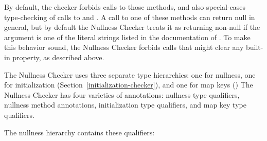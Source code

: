 \begin{enumerate}
\begin{itemize}
  By default, the checker forbids calls to those methods, and also
  special-cases type-checking of calls to
  and
  .
  A call to one of these methods
  can return null in general, but by default the Nullness Checker treats it
  as returning non-null if the argument is one of the literal strings
  listed in the documentation of
  .
  To make this behavior sound, the Nullness Checker forbids calls that
  might clear any built-in property, as described above.
\end{itemize}

\end{enumerate}



The Nullness Checker uses three separate type hierarchies:  one for nullness,
one for initialization (Section~\ref{initialization-checker}),
and one for map keys ()
The Nullness Checker has four varieties of annotations:  nullness
type qualifiers, nullness method annotations, initialization type qualifiers, and
map key type
qualifiers.


The nullness hierarchy contains these qualifiers:


